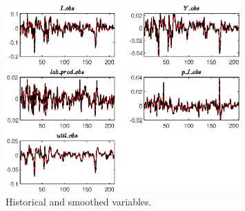  
\begin{figure}[H]
\centering 
\includegraphics[width=0.80\textwidth]{BRS_growth_ext_util/graphs/BRS_growth_ext_util_HistoricalAndSmoothedVariables1}
\caption{Historical and smoothed variables.}\label{Fig:HistoricalAndSmoothedVariables:1}
\end{figure}


